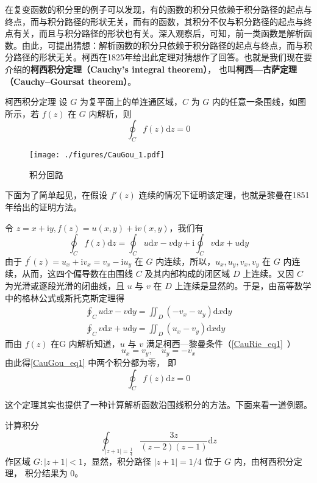 


在复变函数的积分里的例子可以发现，有的函数的积分只依赖于积分路径的起点与终点，而与积分路径的形状无关，而有的函数，其积分不仅与积分路径的起点与终点有关，而且与积分路径的形状也有关。深入观察后，可知，前一类函数是解析函数。由此，可提出猜想：解析函数的积分只依赖于积分路径的起点与终点，而与积分路径的形状无关。柯西在1825年给出此定理对猜想作了回答。也就是我们现在要介绍的\textbf{柯西积分定理（Cauchy's integral theorem）}， 也叫\textbf{柯西—古萨定理（Cauchy–Goursat theorem）}。

\begin{theorem}{柯西积分定理}
设 $G $ 为复平面上的单连通区域，$C $ 为 $G $ 内的任意一条围线，如图所示，若 $f (z)$ 在 $G $ 内解析，则
\begin{equation}
\oint_{C} f(z) \mathrm{d} z=0
\end{equation}
\begin{figure}[ht]
\centering
\texttt{[image: ./figures/CauGou\_1.pdf]}
\caption{积分回路} \label{CauGou_fig1}
\end{figure}

下面为了简单起见，在假设 $f'(z)$ 连续的情况下证明该定理，也就是黎曼在1851年给出的证明方法。

令 $z=x+\mathrm{i} y, f(z)=u(x, y)+\mathrm{i} v(x, y)$，我们有
\begin{equation}
\oint_{C} f(z) \mathrm{d} z=\oint_{C} u \mathrm{d} x-v \mathrm{d} y+\mathrm{i} \oint_{C} v \mathrm{d} x+u \mathrm{d} y
\end{equation}
由于 $f^{\prime}(z)=u_{x}+\mathrm{i} v_{x}=v_{x}-\mathrm{i} u_{y}$ 在 $G $ 内连续，所以，$u_{x}, u_{y}, v_{x}, v_{y}$ 在 $G $ 内连续，从而，这四个偏导数在由围线 $C$ 及其内部构成的闭区域 $D $ 上连续。又因 $C $ 为光滑或逐段光滑的闭曲线，且 $u $ 与 $v $ 在 $D $ 上连续是显然的。于是，由高等数学中的格林公式或斯托克斯定理得
\begin{equation}\label{CauGou_eq1}
\begin{aligned}\oint_C u \mathrm{d} x-v \mathrm{d} y=\iint_{D}\left(-v_{x}-u_{y}\right) \mathrm{d} x \mathrm{d} y \\ \oint_C v \mathrm{d} x+u \mathrm{d} y=\iint_{D}\left(u_{x}-v_{y}\right) \mathrm{d} x \mathrm{d} y\end{aligned}
\end{equation}
而由 $ f (z)$ 在G 内解析知道，$u$ 与 $v$ 满足柯西—黎曼条件（\autoref{CauRie_eq1}~）
\begin{equation}
u_{x}=v_{y}, \quad u_{y}=-v_{x}
\end{equation}
由此得\autoref{CauGou_eq1} 中两个积分都为零， 即
\begin{equation}
\oint_{C} f(z) \mathrm{d} z=0
\end{equation}
\end{theorem}
这个定理其实也提供了一种计算解析函数沿围线积分的方法。下面来看一道例题。
\begin{example}{}
计算积分
\begin{equation}
\oint_{|z+1|=\frac{1}{4}} \frac{3 z}{(z-2)(z-1)} \mathrm{d} z
\end{equation}
作区域 $G:|z+1|<1$，显然，积分路径 $|z+1|=1/4$ 位于 $G$ 内，由柯西积分定理， 积分结果为 0。
\end{example}
